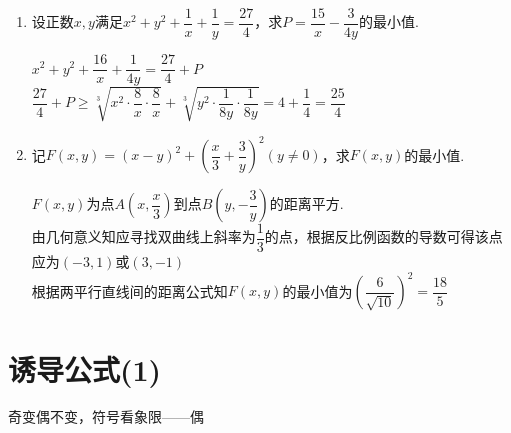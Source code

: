 \begin{enumerate}
\begin{jieda}
    \end{jieda}
    \item 设正数$x, y$满足$x^2+y^2+\dfrac{1}{x} + \dfrac{1}{y} = \dfrac{27}{4}$，求$P = \dfrac{15}{x} - \dfrac{3}{4y}$的最小值.
    \begin{jieda}
        $x^2+y^2+\dfrac{16}{x} + \dfrac{1}{4y} = \dfrac{27}{4} + P$ \\
        $\dfrac{27}{4} + P \geq \sqrt[3]{x^2 \cdot \dfrac{8}{x} \cdot \dfrac{8}{x}} + \sqrt[3]{y^2 \cdot \dfrac{1}{8y} \cdot \dfrac{1}{8y}} = 4 + \dfrac{1}{4} = \dfrac{25}{4}$
    \end{jieda}
    \item 记$F\left(x, y\right) = \left(x-y\right)^2+\left(\dfrac{x}{3} + \dfrac{3}{y}\right)^2\left(y \neq 0\right)$，求$F\left(x, y\right)$的最小值.
    \begin{jieda}
        $F\left(x, y\right)$为点$A\left(x, \dfrac{x}{3}\right)$到点$B\left(y, -\dfrac{3}{y}\right)$的距离平方. \\
        由几何意义知应寻找双曲线上斜率为$\dfrac{1}{3}$的点，根据反比例函数的导数可得该点应为$\left(-3, 1\right)$或$\left(3, -1\right)$ \\
        根据两平行直线间的距离公式知$F\left(x, y\right)$的最小值为$\left(\dfrac{6}{\sqrt{10}}\right)^2 = \dfrac{18}{5}$
    \end{jieda}
\end{enumerate}



\section{诱导公式(1)}
\zsd 奇变偶不变，符号看象限——偶

